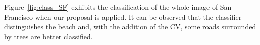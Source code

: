 \documentclass[journal]{IEEEtran}
\begin{document}
Figure~\ref{fig:class_SF} exhibits the classification of the whole image of San Francisco when our proposal is applied. It can be observed that the classifier distinguishes the beach and, with the addition of the CV, some roads surrounded by trees are better classified.

\begin{figure}[hbt]
    \centering
	
	

\end{figure}
\end{document}
